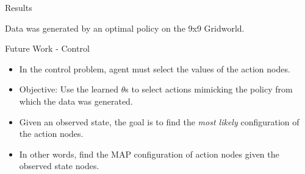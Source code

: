 \documentclass{beamer}
\begin{document}
\begin{frame}{Results}

Data was generated by an optimal policy on the 9x9 Gridworld.
\end{frame}




\begin{frame}{Future Work - Control}
\begin{itemize}
\item In the control problem, agent must select the values of the action nodes. 
\item Objective: Use the learned $\theta$s to select actions mimicking the policy from which the data was generated.
\item Given an observed state, the goal is to find the \textit{most likely} configuration of the action nodes.
\item In other words, find the MAP configuration of action nodes given the observed state nodes.
\end{itemize}
\end{frame}
\end{document}
